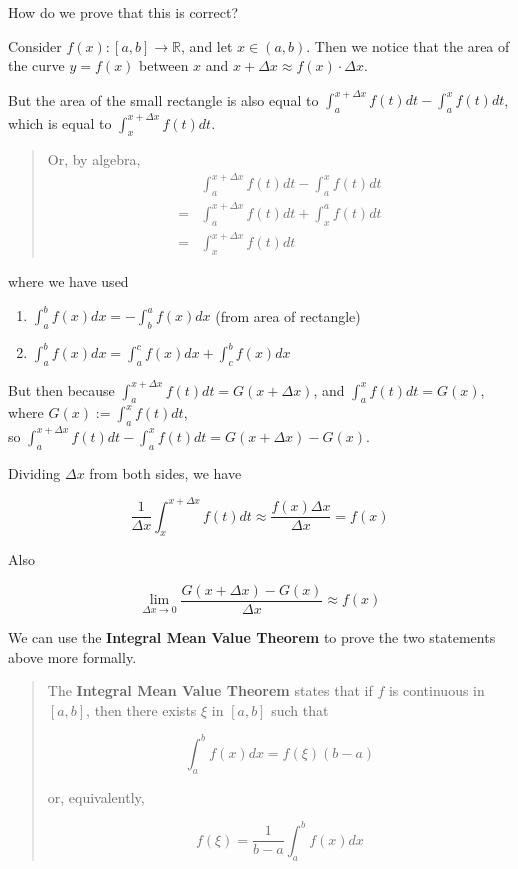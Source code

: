 How do we prove that this is correct?

Consider $f(x): [a, b] \to \mathbb{R}$, and let $x \in (a, b)$. Then we notice that the area of the curve $y = f(x)$ between $x$ and $x + \Delta x \approx f(x) \cdot \Delta x$.

But the area of the small rectangle is also equal to $\int_a^{x+\Delta x} f(t) dt - \int_a^x f(t) dt$, which is equal to $\int_x^{x+\Delta x} f(t) dt$.

\begin{quote}
    Or, by algebra,
    \begin{equation*}
    \begin{split}
        & \int_a^{x + \Delta x} f(t) dt - \int_a^x f(t) dt\\
        =& \int_a^{x + \Delta x} f(t) dt + \int_x^a f(t) dt\\
        =& \int_x^{x + \Delta x} f(t) dt
    \end{split}
    \end{equation*}
\end{quote}

where we have used

\begin{enumerate}
    \item $\int_a^b f(x) dx = -\int_b^a f(x) dx$ (from area of rectangle)
    \item $\int_a^b f(x) dx = \int_a^c f(x) dx + \int_c^b f(x)dx$
\end{enumerate}

But then because $\int_a^{x+\Delta x} f(t) dt = G(x + \Delta x)$, and $\int_a^x f(t) dt = G(x)$, where $G(x) := \int_a^x f(t) dt$,\\
so $\int_a^{x + \Delta x} f(t) dt - \int_a^x f(t) dt = G(x + \Delta x) - G(x)$.

Dividing $\Delta x$ from both sides, we have

$$ \frac{1}{\Delta x} \int_x^{x+\Delta x} f(t) dt \approx \frac{f(x) \Delta x}{\Delta x} = f(x) $$

Also

$$ \lim_{\Delta x \to 0} \frac{G(x + \Delta x) - G(x)}{\Delta x} \approx f(x) $$

We can use the \textbf{Integral Mean Value Theorem} to prove the two statements above more formally.

\begin{quote}
    The \textbf{Integral Mean Value Theorem} states that if $f$ is continuous in $[a, b]$, then there exists $\xi$ in $[a, b]$ such that
    
    $$ \int_a^b f(x) dx = f(\xi) (b - a) $$
    
    or, equivalently,
    
    $$ f(\xi) = \frac{1}{b - a} \int_a^b f(x) dx $$
\end{quote}

